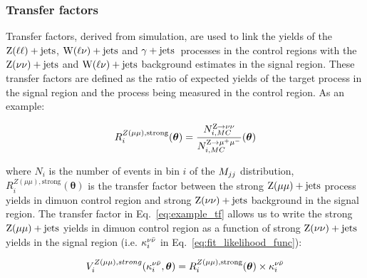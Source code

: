 
\subsubsection{Transfer factors}
\label{subsubsec:transfer_factors}

Transfer factors, derived from simulation,
are used to link the yields of the $\mathrm{Z}(\ell\ell)+\textrm{jets}$, $\mathrm{W}(\ell\nu)+\textrm{jets}$ and $\gamma+\textrm{jets}$~processes in the control
regions with the $\mathrm{Z}(\nu\nu)+\textrm{jets}$ and $\mathrm{W}(\ell\nu)+\textrm{jets}$ background estimates in the signal region.
These transfer factors are defined as the ratio of expected yields of the target process
in the signal region and the process being measured in the control region. As an example:

\begin{equation}
  R_{i}^{Z(\mu\mu), \mathrm{strong}}(\boldsymbol{\theta}) = \frac{N_{i,MC}^{\mathrm{Z}\to\nu\nu}}{N_{i,MC}^{\mathrm{Z}\to\mu^+\mu^-}}(\boldsymbol{\theta})
  \label{eq:example_tf}
\end{equation}

where $N_{i}$ is the number of events in bin $i$ of the $M_{jj}$ distribution, 
$R_{i}^{Z(\mu\mu), \mathrm{strong}}(\boldsymbol{\theta})$ is the transfer factor between the 
strong $\mathrm{Z}(\mu\mu)+\textrm{jets}$ process yields in dimuon control region 
and strong $\mathrm{Z}(\nu\nu)+\textrm{jets}$ background in the signal region. The transfer factor in
Eq.~\ref{eq:example_tf} allows us to write the strong $\mathrm{Z}(\mu\mu)+\textrm{jets}$ yields
in dimuon control region as a function of strong $\mathrm{Z}(\nu\nu)+\textrm{jets}$ yields in the signal region
(i.e. $\kappa_{i}^{\nu\bar{\nu}}$ in Eq.~\ref{eq:fit_likelihood_func}):

\begin{equation}
  V_{i}^{Z(\mu\mu), strong}(\kappa_{i}^{\nu\bar{\nu}},\boldsymbol{\theta}) = R_{i}^{Z(\mu\mu), \mathrm{strong}}(\boldsymbol{\theta}) \times \kappa_{i}^{\nu\bar{\nu}} \\
\end{equation}

